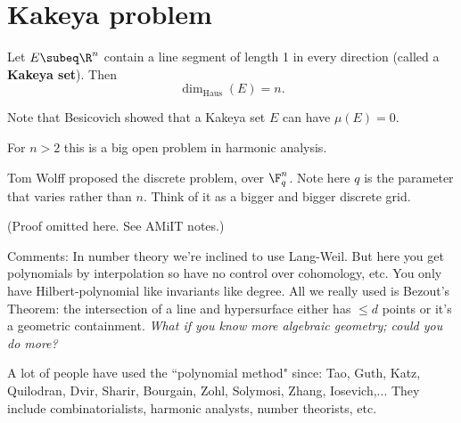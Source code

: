 \def\filepath{C:/Users/Owner/Dropbox/Math/templates}





%


%

\pagestyle{fancy}
\chead{} 
\lfoot{} 
\cfoot{\thepage} 
\rfoot{} 
\renewcommand{\headrulewidth}{.3pt} 
\setlength\voffset{0in}
\setlength\textheight{648pt}



\tableofcontents
\section{Kakeya problem}
\begin{conj}
Let $E\subeq \R^n$ contain a line segment of length 1 in every direction (called a \textbf{Kakeya set}). Then 
\[
\dim_{\text{Haus}}(E)=n.
\]
\end{conj}
Note that Besicovich showed that a Kakeya set $E$ can have $\mu(E)=0$.

For $n>2$ this is a big open problem in harmonic analysis.

Tom Wolff proposed the discrete problem, over $\F_q^n$. Note here $q$ is the parameter that varies rather than $n$. Think of it as a bigger and bigger discrete grid.

(Proof omitted here. See AMiIT notes.)

%
Comments: In number theory we're inclined to use Lang-Weil. But here you get polynomials by interpolation so have no control over cohomology, etc.
You only have Hilbert-polynomial like invariants like degree. 
All we really used is Bezout's Theorem: the intersection of a line and hypersurface either has $\le d$ points or it's a geometric containment.
{\it What if you know more algebraic geometry; could you do more?}

A lot of people have used the ``polynomial method" since: Tao, Guth, Katz, Quilodran, Dvir, Sharir, Bourgain, Zohl, Solymosi, Zhang, Iosevich,... They include combinatorialists, harmonic analysts, number theorists, etc. 


